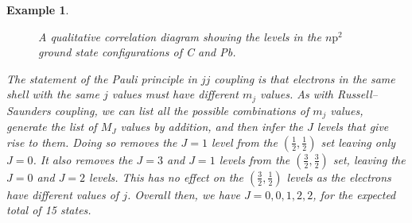 \documentclass{article}
\theoremstyle{plain}\theoremheaderfont{\normalfont\itshape}\theorembodyfont{\rmfamily}\theoremseparator{.}\newtheorem*{rem}{Remark}\newtheorem*{ex}{Example}\newtheorem*{proof}{Proof}\newtheorem*{altp}{Alternative proof}
\theoremstyle{plain}\theoremheaderfont{\normalfont\bfseries}\theorembodyfont{\rmfamily}\theoremseparator{.}\newtheorem{thm}{Theorem}[section]\newtheorem{lem}[thm]{Lemma}\newtheorem{prop}[thm]{Proposition}\newtheorem*{cor}{Corollary}\newtheorem{defn}[thm]{Definition}\newtheorem{clm}[thm]{Claim}\newtheorem{clminproof}{Claim}
\theoremstyle{break}\theoremheaderfont{\normalfont\itshape}\theorembodyfont{\rmfamily}\theoremseparator{.\medskip}\newtheorem*{proofskip}{Proof}\newtheorem*{exs}{Examples}\newtheorem*{rems}{Remarks}
\theoremstyle{break}\theoremheaderfont{\normalfont\bfseries}\theorembodyfont{\rmfamily}\theoremseparator{.\medskip}\newtheorem{lemskip}[thm]{Lemma}\newtheorem{defnskip}[thm]{Definition}\newtheorem{propskip}[thm]{Proposition}\newtheorem{thmskip}[thm]{Theorem}
\numberwithin{equation}{section}
\begin{document}
\begin{ex}
\begin{figure}
            \caption{A qualitative correlation diagram showing the levels in the \(n\mathrm{p^2}\) ground state configurations of C and Pb.}
            \label{Fig:jj_LS_correlation_diagram}
        \end{figure}

        The statement of the Pauli principle in \(jj\) coupling is that electrons in the same shell with the same \(j\) values must have different \(m_j\) values. As with Russell--Saunders coupling, we can list all the possible combinations of \(m_j\) values, generate the list of \(M_J\) values by addition, and then infer the \(J\) levels that give rise to them. Doing so removes the \(J=1\) level from the \((\frac{1}{2},\frac{1}{2})\) set leaving only \(J=0\). It also removes the \(J=3\) and \(J=1\) levels from the \((\frac{3}{2},\frac{3}{2})\) set, leaving the \(J=0\) and \(J=2\) levels. This has no effect on the \((\frac{3}{2},\frac{1}{2})\) levels as the electrons have different values of \(j\). Overall then, we have \(J=0,0,1,2,2\), for the expected total of 15 states.


\end{ex}
\end{document}
